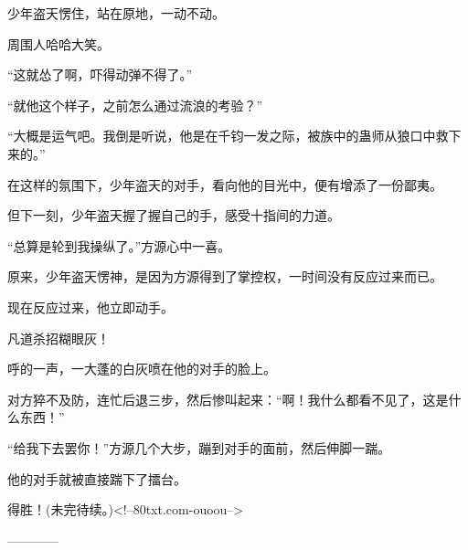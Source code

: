 \begin{this_body}
少年盗天愣住，站在原地，一动不动。

周围人哈哈大笑。

“这就怂了啊，吓得动弹不得了。”

“就他这个样子，之前怎么通过流浪的考验？”

“大概是运气吧。我倒是听说，他是在千钧一发之际，被族中的蛊师从狼口中救下来的。”

在这样的氛围下，少年盗天的对手，看向他的目光中，便有增添了一份鄙夷。

但下一刻，少年盗天握了握自己的手，感受十指间的力道。

“总算是轮到我操纵了。”方源心中一喜。

原来，少年盗天愣神，是因为方源得到了掌控权，一时间没有反应过来而已。

现在反应过来，他立即动手。

凡道杀招糊眼灰！

呼的一声，一大蓬的白灰喷在他的对手的脸上。

对方猝不及防，连忙后退三步，然后惨叫起来：“啊！我什么都看不见了，这是什么东西！”

“给我下去罢你！”方源几个大步，蹦到对手的面前，然后伸脚一踹。

他的对手就被直接踹下了擂台。

得胜！(未完待续。)<!--80txt.com-ouoou-->

------------

\end{this_body}

